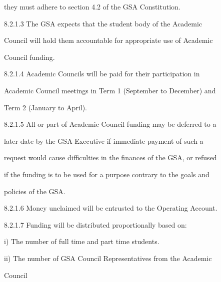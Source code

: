      they must adhere to section 4.2 of the GSA Constitution.   



  



8.2.1.3       The  GSA  expects  that  the  student  body  of  the  Academic  

     Council  will hold them accountable for appropriate use of  Academic  

     Council funding.   



  



8.2.1.4       Academic   Councils   will  be  paid   for  their  participation  in  

     Academic Council meetings in Term 1 (September to December) and  

     Term 2 (January to April).   



  



8.2.1.5       All or part of Academic Council   funding may be deferred to a  

     later  date  by  the  GSA  Executive  if  immediate  payment  of  such  a  

     request would cause difficulties in the finances of the GSA, or refused  

     if  the  funding  is  to  be  used  for  a  purpose  contrary  to  the  goals  and  

     policies of the GSA.   



  



8.2.1.6       Money unclaimed will be entrusted to the Operating Account.   



  



8.2.1.7       Funding will be distributed proportionally based on:   



  



i)       The number of full time and part time students.   



ii)      The number of GSA Council Representatives  from the Academic  

         Council  



